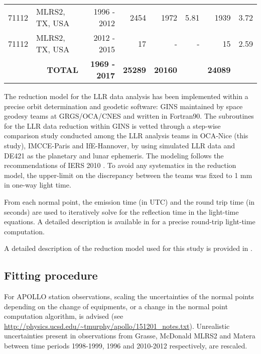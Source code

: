 \documentclass[fleqn,usenatbib,referee]{mnras}
\begin{document}
\begin{table*}
\begin{tabular}{clrrrrrr}
    71112         & MLRS2, TX, USA                             & 1996 - 2012                      &  2454             & 1972      & 5.81     & 1939          &  3.72        \\ 
    71112         & MLRS2, TX, USA                             & 2012 - 2015                      &  17               &  -        & -        & 15            &  2.59        \\  \midrule
    \multicolumn{2}{r}{\textbf{TOTAL}}                   &  \textbf{1969 - 2017}                & \textbf{25289}                  & \textbf{20160} &     & \textbf{24089}         &              \\ \bottomrule
    \end{tabular}
    \end{table*}

  The reduction model for the LLR data analysis has been implemented within a precise orbit determination and geodetic software: GINS \cite[]{marty2011gins,viswanathan2015utilizing} maintained by space geodesy teams at GRGS/OCA/CNES and written in Fortran90. The subroutines for the LLR data reduction within GINS is vetted through a step-wise comparison study conducted among the LLR analysis teams in OCA-Nice (this study), IMCCE-Paris and IfE-Hannover, by using simulated LLR data and DE421 \cite[]{Folkner2009} as the planetary and lunar ephemeris. The modeling follows the recommendations of IERS 2010 \cite[]{IERS2010}. To avoid any systematics in the reduction model, the upper-limit on the discrepancy between the teams was fixed to 1 mm in one-way light time.

  From each normal point, the emission time (in UTC) and the round trip time (in seconds) are used to iteratively solve for the reflection time in the light-time equations. A detailed description is available in \citet[Section 8 \& 11]{Moyer2003} for a precise round-trip light-time computation. 
  
  A detailed description of the reduction model used for this study is provided in \cite{Manche2011}. 

 \subsection{Fitting procedure}
 \label{appendixB}

    For APOLLO station observations, scaling the uncertainties of the normal points depending on the change of equipments, or a change in the normal point computation algorithm, is advised (see \url{http://physics.ucsd.edu/~tmurphy/apollo/151201_notes.txt}). Unrealistic uncertainties present in observations from Grasse, McDonald MLRS2 and Matera between time periods 1998-1999, 1996 and 2010-2012 respectively, are rescaled. 
\end{document}
